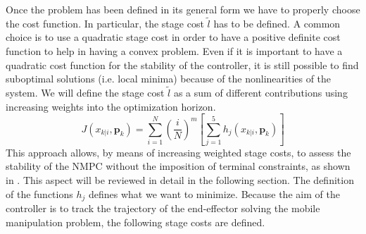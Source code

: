 Once the problem has been defined in its general form we have to properly choose the cost function. In particular, the stage cost $\tilde{l}$ has to be defined. A common choice is to use a quadratic stage cost in order to have a positive definite cost function to help in having a convex problem. Even if it is important to have a quadratic cost function for the stability of the controller, it is still possible to find suboptimal solutions (i.e. local minima) because of the nonlinearities of the system. We will define the stage cost $\tilde{l}$ as a sum of different contributions using increasing weights into the optimization horizon. 
\begin{equation}\label{costfunctionh}
J({x}_{k|i},\textbf{p}_k)=\sum_{i=1}^{N}\left(\frac{i}{N}\right)^m \left[ \sum_{j=1}^{5} h_j({x}_{k|i},\textbf{p}_k) \right]
\end{equation} 
This approach allows, by means of increasing weighted stage costs, to assess the stability of the NMPC without the imposition of terminal constraints, as shown in \cite{alamir2018stability}. This aspect will be reviewed in detail in the following section.
The definition of the functions $h_j$ defines what we want to minimize. Because the aim of the controller is to track the trajectory of the end-effector solving the mobile manipulation problem, the following stage costs are defined.
